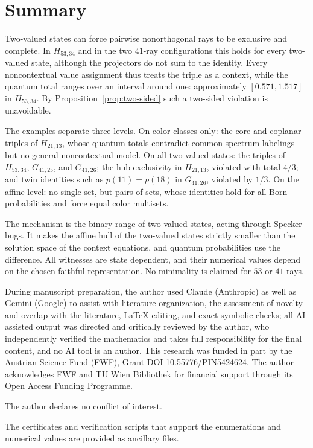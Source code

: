 \documentclass[aps,pra,reprint,superscriptaddress,longbibliography,nofootinbib,floatfix,10pt]{revtex4-2}
\theoremstyle{definition}\newtheorem{definition}[theorem]{Definition}
\theoremstyle{remark}\newtheorem{remark}[theorem]{Remark}
\begin{document}
\section{Summary}\label{sec:conclusion}
Two-valued states can force pairwise nonorthogonal rays to be exclusive and complete. In $H_{53,34}$ and in the two $41$-ray configurations this holds for every two-valued state, although the projectors do not sum to the identity. Every noncontextual value assignment thus treats the triple as a context, while the quantum total ranges over an interval around one: approximately $[0.571,1.517]$ in $H_{53,34}$. By Proposition~\ref{prop:two-sided} such a two-sided violation is unavoidable.

The examples separate three levels. On color classes only: the core and coplanar triples of $H_{21,13}$, whose quantum totals contradict common-spectrum labelings but no general noncontextual model. On all two-valued states: the triples of $H_{53,34}$, $G_{41,25}$, and $G_{41,26}$; the hub exclusivity in $H_{21,13}$, violated with total $4/3$; and twin identities such as $p(11)=p(18)$ in $G_{41,26}$, violated by $1/3$. On the affine level: no single set, but pairs of sets, whose identities hold for all Born probabilities and force equal color multisets.

The mechanism is the binary range of two-valued states, acting through Specker bugs. It makes the affine hull of the two-valued states strictly smaller than the solution space of the context equations, and quantum probabilities use the difference. All witnesses are state dependent, and their numerical values depend on the chosen faithful representation. No minimality is claimed for $53$ or $41$ rays.

\begin{acknowledgments}
During manuscript preparation, the author used Claude (Anthropic) as well as Gemini (Google) to assist with literature organization,
the assessment of novelty and overlap with the literature, LaTeX editing, and exact symbolic checks;
all AI-assisted output was directed and critically reviewed by the author,
 who independently verified the mathematics and takes full responsibility for the final content, and no AI tool is an author.
This research was funded in part by the Austrian
Science Fund (FWF), Grant DOI \href{https://doi.org/10.55776/PIN5424624}{10.55776/PIN5424624}.
The author acknowledges FWF and TU Wien Bibliothek for financial support through its Open Access Funding Programme.

The author declares no conflict of interest.

The certificates and verification scripts that support the enumerations and numerical values are provided as ancillary files.
\end{acknowledgments}

\def\doibase{https://doi.org/}

\end{document}
